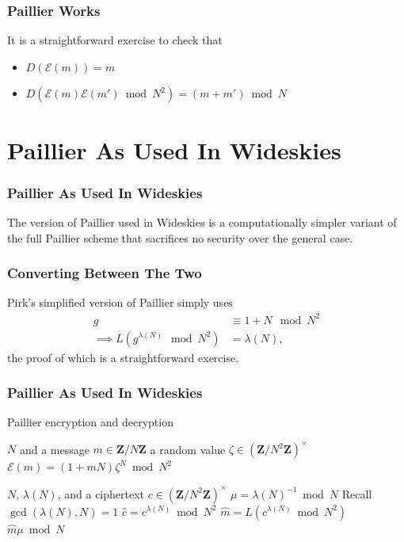 \documentclass{beamer}
\makeatletter
\DeclareRobustCommand{\NAME}{Wideskies\xspace}
\newcommand{\Z}{\ensuremath{\mathbf{Z}}}
\newcommand{\zmodn}{\ensuremath{\Z/N\Z}}
\newcommand{\zmodntunits}{\ensuremath{\left(\Z/N^{2}\Z\right)^{\times}}}
\DeclareRobustCommand*{\&}{%
  \nfss@text{%
    \fontfamily{LinuxBiolinumT-TLF}%
    \selectfont
    \symbol{`\&}%
  }%
}
\makeatother
\begin{document}
\begin{frame}
\frametitle{Paillier Works}
  It is a straightforward exercise to check that 
  \begin{itemize}
    \item $D(\mathcal{E}(m)) = m$
    \item $D(\mathcal{E}(m)\mathcal{E}(m')\bmod N^2) = (m + m') \bmod N $
  \end{itemize}
\end{frame}

\section{Paillier As Used In \NAME}
\begin{frame}
\frametitle{Paillier As Used In \NAME}
The version of Paillier used in \NAME is a computationally simpler variant of the
full Paillier scheme that sacrifices no security over the general case.
\end{frame}

\begin{frame}
  \frametitle{Converting Between The Two}
  Pirk's simplified version of Paillier simply uses
  \begin{align*}
    g &\equiv 1 + N \mod N^2\\
    \implies L(g^{\lambda(N)} \mod N^2) &= \lambda(N),
  \end{align*}
  the proof of which is a straightforward exercise.
\end{frame}

\begin{frame}
\frametitle{Paillier As Used In \NAME}
\begin{algorithm}[H]
  \caption{Paillier encryption and decryption}\label{alg.paillier_encrypt}
  \begin{algorithmic}[1]
    \State \Given \(N\) and a message \(m\in\zmodn\)
    \State \Select a random value \(\zeta\in\zmodntunits\)
    \State \Return \(\mathcal{E}(m) = (1+mN)\zeta^{N}\bmod{N^{2}}\)
    \EndProcedure
  \end{algorithmic}

  \begin{algorithmic}[1]
    \State \Given \(N\), \(\lambda(N)\), and a ciphertext \(c\in\zmodntunits\)
    \State \Set \(\mu = \lambda(N)^{-1}\bmod N\)
    \Comment Recall \(\gcd(\lambda(N), N) = 1\)
    \State \Set \(\hat{c} = c^{\lambda(N)}\bmod N^{2}\)
    \State\label{step.div}\Set \(\hat{m} = L(c^{\lambda(N)}\bmod N^{2})\)
    \State \Return \(\hat{m}\mu\bmod N\)
    \EndProcedure
  \end{algorithmic}
\end{algorithm}
\end{frame}
\end{document}
